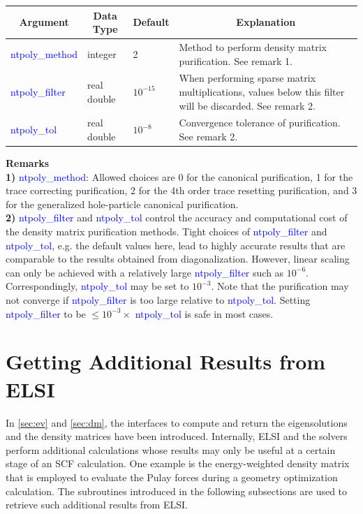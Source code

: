 \documentclass{report}
\begin{document}
\begin{tabular}[]{|p{30mm}|p{20mm}|p{15mm}|p{100mm}|}
\hline
\multicolumn{1}{|c|}{\textbf{Argument}} & \multicolumn{1}{c|}{\textbf{Data Type}} & \multicolumn{1}{c|}{\textbf{Default}} & \multicolumn{1}{c|}{\textbf{Explanation}}\\
\hline
\textcolor{blue}{ntpoly\_method} & integer     & 2          & Method to perform density matrix purification.  See remark 1.\\
\hline
\textcolor{blue}{ntpoly\_filter} & real double & $10^{-15}$ & When performing sparse matrix multiplications, values below this filter will be discarded.  See remark 2.\\
\hline
\textcolor{blue}{ntpoly\_tol}    & real double & $10^{-8}$  & Convergence tolerance of purification.  See remark 2.\\
\hline
\end{tabular}

\bigskip
\textbf{Remarks}\\

\textbf{1)} \textcolor{blue}{ntpoly\_method}:  Allowed choices are 0 for the canonical purification, 1 for the trace correcting purification, 2 for the 4th order trace resetting purification, and 3 for the generalized hole-particle canonical purification.\\

\textbf{2)} \textcolor{blue}{ntpoly\_filter} and \textcolor{blue}{ntpoly\_tol} control the accuracy and computational cost of the density matrix purification methods.  Tight choices of \textcolor{blue}{ntpoly\_filter} and \textcolor{blue}{ntpoly\_tol}, e.g. the default values here, lead to highly accurate results that are comparable to the results obtained from diagonalization.  However, linear scaling can only be achieved with a relatively large \textcolor{blue}{ntpoly\_filter} such as $10^{-6}$.  Correspondingly, \textcolor{blue}{ntpoly\_tol} may be set to $10^{-3}$.  Note that the purification may not converge if \textcolor{blue}{ntpoly\_filter} is too large relative to \textcolor{blue}{ntpoly\_tol}.  Setting \textcolor{blue}{ntpoly\_filter} to be $\le 10^{-3} \times $ \textcolor{blue}{ntpoly\_tol} is safe in most cases.\\

\section{Getting Additional Results from ELSI}
\label{sec:getter}
In \ref{sec:ev} and \ref{sec:dm}, the interfaces to compute and return the eigensolutions and the density matrices have been introduced.  Internally, ELSI and the solvers perform additional calculations whose results may only be useful at a certain stage of an SCF calculation.  One example is the energy-weighted density matrix that is employed to evaluate the Pulay forces during a geometry optimization calculation.  The subroutines introduced in the following subsections are used to retrieve such additional results from ELSI.\\
\end{document}
